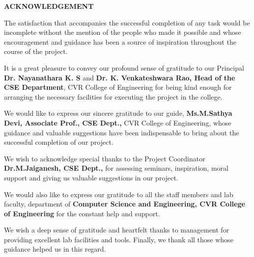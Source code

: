 \documentclass[../Report.tex]{subfiles}
\begin{document}
\begin{center}
    \textbf{ACKNOWLEDGEMENT}
\end{center}
\hspace{1cm}The satisfaction that accompanies the successful completion of any task
would be incomplete without the mention of the people who made it possible
and whose encouragement and guidance has been a source of inspiration
throughout the course of the project.\par

\hspace{1cm}It is a great pleasure to convey our profound sense of gratitude to our
Principal \textbf{Dr. Nayanathara K. S} and \textbf{Dr. K. Venkateshwara Rao, Head of the
CSE Department}, CVR College of Engineering for being kind enough for
arranging the necessary facilities for executing the project in the college.\par

\hspace{1cm}We would like to express our sincere gratitude to our guide,
\textbf{Ms.M.Sathya Devi, Associate Prof., CSE Dept.,} CVR College of Engineering,
whose guidance and valuable suggestions have been indispensable to bring
about the successful completion of our project.\par

\hspace{1cm}We wish to acknowledge special thanks to the Project Coordinator
\textbf{Dr.M.Jaiganesh, CSE Dept.,} for assessing seminars, inspiration, moral support
and giving us valuable suggestions in our project.\par

\hspace{1cm}We would also like to express our gratitude to all the staff members and
lab faculty, department of \textbf{Computer Science and Engineering, CVR College
of Engineering} for the constant help and support.\par

\hspace{1cm}We wish a deep sense of gratitude and heartfelt thanks to management for
providing excellent lab facilities and tools. Finally, we thank all those whose 
guidance helped us in this regard. \par


\pagebreak
\end{document}
